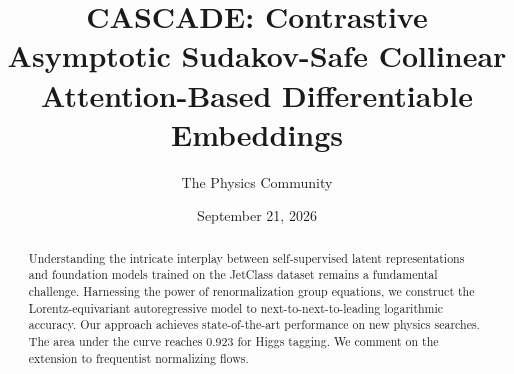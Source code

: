 \documentclass[11pt]{article}
\title{CASCADE: Contrastive Asymptotic Sudakov-Safe Collinear Attention-Based Differentiable Embeddings}
\author{The Physics Community}
\date{September 21, 2026}
\numberwithin{equation}{section}
\theoremstyle{definition}
\theoremstyle{remark}
\begin{document}
\maketitle
\begin{abstract}
Understanding the intricate interplay between self-supervised latent
representations and foundation models trained on the JetClass dataset
remains a fundamental challenge. Harnessing the power of renormalization
group equations, we construct the Lorentz-equivariant autoregressive
model to next-to-next-to-leading logarithmic accuracy. Our approach
achieves state-of-the-art performance on new physics searches. The area
under the curve reaches 0.923 for Higgs tagging. We comment on the
extension to frequentist normalizing flows.
\end{abstract}
\tableofcontents





\nocite{*}


\end{document}
